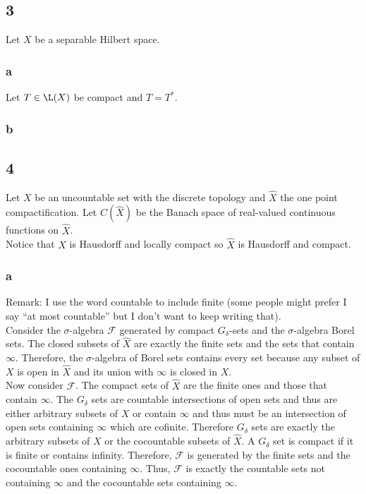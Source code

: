 \documentclass[12pt]{article}
\renewcommand{\F}{\mathcal{F}}
\begin{document}
\subsection{3}

Let $X$ be a separable Hilbert space. 

\subsubsection{a}

Let $T \in \L(X)$ be compact and $T = T^*$. 

\subsubsection{b}

\subsection{4}

Let $X$ be an uncountable set with the discrete topology and $\hat{X}$ the one point compactification. Let $C(\hat{X})$ be the Banach space of real-valued continuous functions on $\hat{X}$. 
\bigskip\\
Notice that $X$ is Hausdorff and locally compact so $\hat{X}$ is Hausdorff and compact. 

\subsubsection{a}

Remark: I use the word countable to include finite (some people might prefer I say ``at most countable'' but I don't want to keep writing that).
\bigskip\\
Consider the $\sigma$-algebra $\F$ generated by compact $G_\delta$-sets and the $\sigma$-algebra Borel sets. The closed subsets of $\hat{X}$ are exactly the finite sets and the sets that contain $\infty$. Therefore, the $\sigma$-algebra of Borel sets contains every set because any subset of $X$ is open in $\hat{X}$ and its union with $\infty$ is closed in $X$. 
\bigskip\\
Now consider $\F$. The compact sets of $\hat{X}$ are the finite ones and those that contain $\infty$. The $G_\delta$ sets are countable intersections of open sets and thus are either arbitrary subsets of $X$ or contain $\infty$ and thus must be an intersection of open sets containing $\infty$ which are cofinite. Therefore $G_\delta$ sets are exactly the arbitrary subsets of $X$ or the cocountable subsets of $\hat{X}$. A $G_\delta$ set is compact if it is finite or contains infinity. Therefore, $\F$ is generated by the finite sets and the cocountable ones containing $\infty$. Thus, $\F$ is exactly the countable sets not containing $\infty$ and the cocountable sets containing $\infty$.
\end{document}
